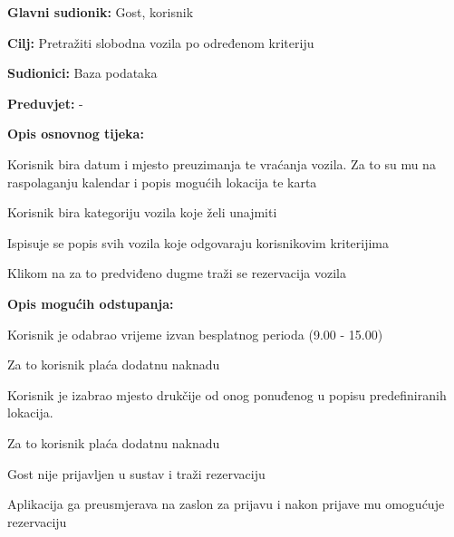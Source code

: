 					\noindent {}
					\begin{packed_item}
	
						\item \textbf{Glavni sudionik: }Gost, korisnik
						\item  \textbf{Cilj: }Pretražiti slobodna vozila po određenom kriteriju
						\item  \textbf{Sudionici: }Baza podataka
						\item  \textbf{Preduvjet: }-
						\item  \textbf{Opis osnovnog tijeka:}
						
						\item[] \begin{packed_enum}
							\item Korisnik bira datum i mjesto preuzimanja te vraćanja vozila. Za to su mu na raspolaganju kalendar i popis mogućih lokacija te karta
							\item Korisnik bira kategoriju vozila koje želi unajmiti
							\item Ispisuje se popis svih vozila koje odgovaraju korisnikovim kriterijima
							\item Klikom na za to predviđeno dugme traži se rezervacija vozila
						\end{packed_enum}
						
						\item  \textbf{Opis mogućih odstupanja: }
						
						\item[] \begin{packed_item}
	                        
	                        \item[1.a] Korisnik je odabrao vrijeme izvan besplatnog perioda (9.00 - 15.00)
							\item[] \begin{packed_enum}
								\item Za to korisnik plaća dodatnu naknadu
							\end{packed_enum}
							\item[1.b] Korisnik je izabrao mjesto drukčije od onog ponuđenog u popisu predefiniranih lokacija.
							\item[] \begin{packed_enum}
								\item Za to korisnik plaća dodatnu naknadu
							\end{packed_enum}
							\item[4.a] Gost nije prijavljen u sustav i traži rezervaciju
							\item[] \begin{packed_enum}
								\item Aplikacija ga preusmjerava na zaslon za prijavu i nakon prijave mu omogućuje rezervaciju
							\end{packed_enum}
						\end{packed_item}
						
					\end{packed_item}
					
